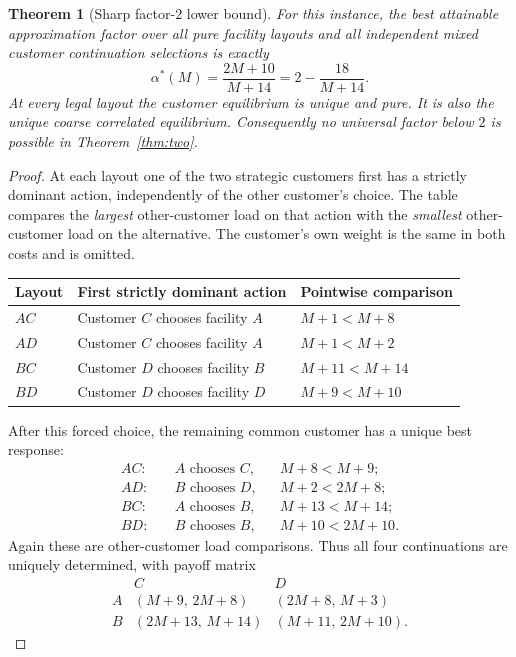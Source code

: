\documentclass[11pt]{article}
\newtheorem{theorem}{Theorem}[section]
\theoremstyle{definition}
\theoremstyle{remark}
\begin{document}
\begin{theorem}[Sharp factor-$2$ lower bound]\label{thm:two-lower}
For this instance, the best attainable approximation factor over all pure facility layouts and all independent mixed customer continuation selections is exactly
\begin{equation}\label{eq:alpha-M}
 \alpha^*(M)=\frac{2M+10}{M+14}=2-\frac{18}{M+14}.
\end{equation}
At every legal layout the customer equilibrium is unique and pure. It is also the unique coarse correlated equilibrium. Consequently no universal factor below $2$ is possible in Theorem~\ref{thm:two}.
\end{theorem}
\begin{proof}
At each layout one of the two strategic customers first has a strictly dominant action, independently of the other customer's choice. The table compares the \emph{largest} other-customer load on that action with the \emph{smallest} other-customer load on the alternative. The customer's own weight is the same in both costs and is omitted.
\begin{center}
\begin{tabular}{@{}lll@{}}
\toprule
Layout & First strictly dominant action & Pointwise comparison \\
\midrule
$AC$ & Customer $C$ chooses facility $A$ & $M+1<M+8$ \\
$AD$ & Customer $C$ chooses facility $A$ & $M+1<M+2$ \\
$BC$ & Customer $D$ chooses facility $B$ & $M+11<M+14$ \\
$BD$ & Customer $D$ chooses facility $D$ & $M+9<M+10$ \\
\bottomrule
\end{tabular}
\end{center}
After this forced choice, the remaining common customer has a unique best response:
\begin{align*}
 AC:&\quad A\text{ chooses }C,&& M+8<M+9;\\
 AD:&\quad B\text{ chooses }D,&& M+2<2M+8;\\
 BC:&\quad A\text{ chooses }B,&& M+13<M+14;\\
 BD:&\quad B\text{ chooses }B,&& M+10<2M+10.
\end{align*}
Again these are other-customer load comparisons. Thus all four continuations are uniquely determined, with payoff matrix
\begin{equation}\label{eq:M-payoffs}
\begin{array}{c|cc}
 &C&D\\ \hline
 A&(M+9,\,2M+8)&(2M+8,\,M+3)\\
 B&(2M+13,\,M+14)&(M+11,\,2M+10).
\end{array}
\end{equation}


\end{proof}
\end{document}
